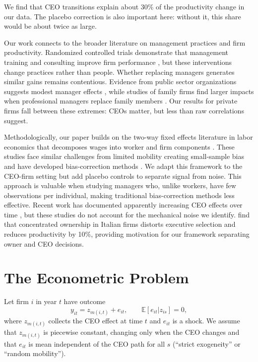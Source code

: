 \documentclass[11pt,a4paper]{article}
\begin{document}
We find that CEO transitions explain about 30\% of the productivity change in our data. The placebo correction is also important here: without it, this share would be about twice as large.

Our work connects to the broader literature on management practices and firm productivity. Randomized controlled trials demonstrate that management training and consulting improve firm performance \citep{bloom2013does, mckenzie2021small}, but these interventions change practices rather than people. Whether replacing managers generates similar gains remains contentious. Evidence from public sector organizations suggests modest manager effects \citep{fenizia2022managers, janke2024role}, while studies of family firms find larger impacts when professional managers replace family members \citep{bennedsen2007inside, sraer2007performance}. Our results for private firms fall between these extremes: CEOs matter, but less than raw correlations suggest.

Methodologically, our paper builds on the two-way fixed effects literature in labor economics that decomposes wages into worker and firm components \citep{Abowd1999Econometrica, Card2018JoLE}. These studies face similar challenges from limited mobility creating small-sample bias \citep{andrews2008high} and have developed bias-correction methods \citep{Bonhomme2023-dx, gaure2014correlation}. We adapt this framework to the CEO-firm setting but add placebo controls to separate signal from noise. This approach is valuable when studying managers who, unlike workers, have few observations per individual, making traditional bias-correction methods less effective. Recent work has documented apparently increasing CEO effects over time \citep{quigley2015has}, but these studies do not account for the mechanical noise we identify. \citet{lippi2014corporate} find that concentrated ownership in Italian firms distorts executive selection and reduces productivity by 10\%, providing motivation for our framework separating owner and CEO decisions.

\section{The Econometric Problem}

Let firm $i$ in year $t$ have outcome
\begin{equation}\label{eq:model1}
  y_{it} = z_{m(i,t)} + e_{it},\qquad \mathbb E[e_{it}|z_{is}]=0,
\end{equation}
where $z_{m(i,t)}$ collects the CEO effect at time $t$ and $e_{it}$ is a shock. We assume that $z_{m(i,t)}$ is piecewise constant, changing only when the CEO changes and that $e_{it}$ is mean independent of the CEO path for all $s$ (``strict exogeneity'' or ``random mobility'').
\end{document}
